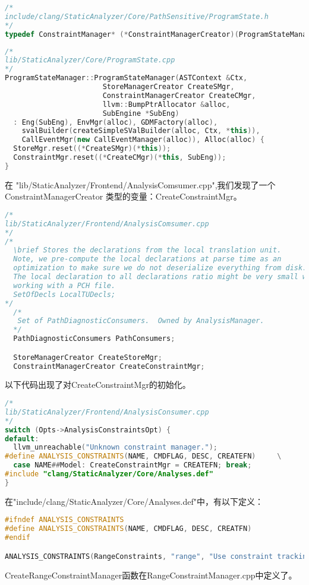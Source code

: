 \documentclass[a4paper]{article}
\begin{document}
  \begin{lstlisting}[language=C++]
/*
include/clang/StaticAnalyzer/Core/PathSensitive/ProgramState.h  
*/
typedef ConstraintManager* (*ConstraintManagerCreator)(ProgramStateManager&,SubEngine*);    
  \end{lstlisting}
  \begin{lstlisting}[language=C++]
/*
lib/StaticAnalyzer/Core/ProgramState.cpp  
*/
ProgramStateManager::ProgramStateManager(ASTContext &Ctx,
                       StoreManagerCreator CreateSMgr,
                       ConstraintManagerCreator CreateCMgr,
                       llvm::BumpPtrAllocator &alloc,
                       SubEngine *SubEng)
  : Eng(SubEng), EnvMgr(alloc), GDMFactory(alloc),
    svalBuilder(createSimpleSValBuilder(alloc, Ctx, *this)),
    CallEventMgr(new CallEventManager(alloc)), Alloc(alloc) {
  StoreMgr.reset((*CreateSMgr)(*this));
  ConstraintMgr.reset((*CreateCMgr)(*this, SubEng));
}    
  \end{lstlisting}
在 "lib/StaticAnalyzer/Frontend/AnalysisComsumer.cpp",我们发现了一个 ConstraintManagerCreator 类型的变量：CreateConstraintMgr。
\begin{lstlisting}[language=C++]
/*
lib/StaticAnalyzer/Frontend/AnalysisComsumer.cpp
*/
/* 
  \brief Stores the declarations from the local translation unit.
  Note, we pre-compute the local declarations at parse time as an
  optimization to make sure we do not deserialize everything from disk.
  The local declaration to all declarations ratio might be very small when
  working with a PCH file.
  SetOfDecls LocalTUDecls;
*/                           
  /*
   Set of PathDiagnosticConsumers.  Owned by AnalysisManager.
  */
  PathDiagnosticConsumers PathConsumers;

  StoreManagerCreator CreateStoreMgr;
  ConstraintManagerCreator CreateConstraintMgr;

\end{lstlisting}  
以下代码出现了对CreateConstraintMgr的初始化。
\begin{lstlisting}[language=C++]
/*
lib/StaticAnalyzer/Frontend/AnalysisConsumer.cpp
*/
switch (Opts->AnalysisConstraintsOpt) {
default:
  llvm_unreachable("Unknown constraint manager.");
#define ANALYSIS_CONSTRAINTS(NAME, CMDFLAG, DESC, CREATEFN)     \
  case NAME##Model: CreateConstraintMgr = CREATEFN; break;
#include "clang/StaticAnalyzer/Core/Analyses.def"
}  
\end{lstlisting}
在"include/clang/StaticAnalyzer/Core/Analyses.def"中，有以下定义：
\begin{lstlisting}[language=C++]
#ifndef ANALYSIS_CONSTRAINTS
#define ANALYSIS_CONSTRAINTS(NAME, CMDFLAG, DESC, CREATFN)
#endif

ANALYSIS_CONSTRAINTS(RangeConstraints, "range", "Use constraint tracking of concrete value ranges", CreateRangeConstraintManager)  
\end{lstlisting}
CreateRangeConstraintManager函数在RangeConstraintManager.cpp中定义了。
\end{document}
